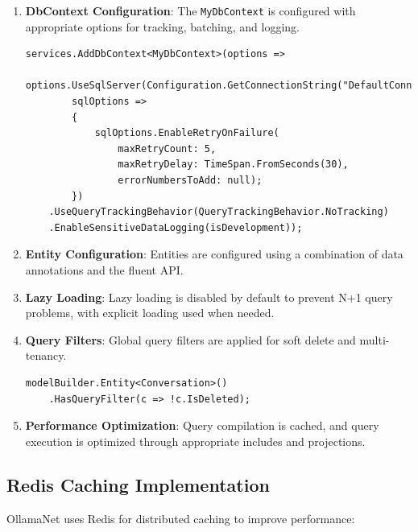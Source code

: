 \begin{enumerate}
   \item \textbf{DbContext Configuration}: The \texttt{MyDbContext} is configured with appropriate options for tracking, batching, and logging.

\begin{verbatim}
services.AddDbContext<MyDbContext>(options =>
    options.UseSqlServer(Configuration.GetConnectionString("DefaultConnection"),
        sqlOptions =>
        {
            sqlOptions.EnableRetryOnFailure(
                maxRetryCount: 5,
                maxRetryDelay: TimeSpan.FromSeconds(30),
                errorNumbersToAdd: null);
        })
    .UseQueryTrackingBehavior(QueryTrackingBehavior.NoTracking)
    .EnableSensitiveDataLogging(isDevelopment));
\end{verbatim}

   \item \textbf{Entity Configuration}: Entities are configured using a combination of data annotations and the fluent API.

   \item \textbf{Lazy Loading}: Lazy loading is disabled by default to prevent N+1 query problems, with explicit loading used when needed.

   \item \textbf{Query Filters}: Global query filters are applied for soft delete and multi-tenancy.

\begin{verbatim}
modelBuilder.Entity<Conversation>()
    .HasQueryFilter(c => !c.IsDeleted);
\end{verbatim}

   \item \textbf{Performance Optimization}: Query compilation is cached, and query execution is optimized through appropriate includes and projections.
\end{enumerate}

\subsection{Redis Caching Implementation}

OllamaNet uses Redis for distributed caching to improve performance:

